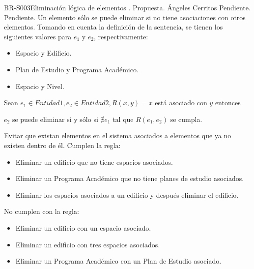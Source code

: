 \begin{BusinessRule}{BR-S003}{Eliminación lógica de elementos}
	{\bcCondition}    %
	{\btEnabler}     %
	{\blControlling}    %
	.
	\BRItem[Estado] Propuesta.
	 Ángeles Cerritos
	 Pendiente.
	 Pendiente.
	\BRItem[Descripción] Un elemento sólo se puede eliminar si no tiene asociaciones con otros elementos. Tomando en cuenta la definición de la sentencia, se tienen los siguientes valores para $e_1$ y $e_2$, respectivamente:
	
	\begin{itemize}
		\item Espacio y Edificio.
		\item Plan de Estudio y Programa Académico.
		\item Espacio y Nivel.
	\end{itemize}
	
	\BRItem[Sentencia] Sean $ e_1 \in Entidad1 , e_2 \in Entidad2, R(x,y) = x $ está asociado con $ y $ entonces
	
	$ e_2 $ se puede eliminar si y sólo si $ \nexists e_1 $ tal que $ R(e_1, e_2) $ se cumpla.
	
	
	\BRItem[Motivación] Evitar que existan elementos en el sistema asociados a elementos que ya no existen dentro de él.
	 Cumplen la regla:
	\begin{itemize}
		\item Eliminar un edificio que no tiene espacios asociados.
		\item Eliminar un Programa Académico que no tiene planes de estudio asociados.
		\item Eliminar los espacios asociados a un edificio y después eliminar el edificio.
	\end{itemize}
	 No cumplen con la regla:
	\begin{itemize}
		\item Eliminar un edificio con un espacio asociado.
		\item Eliminar un edificio con tres espacios asociados.
		\item Eliminar un Programa Académico con un Plan de Estudio asociado.
	\end{itemize}
\end{BusinessRule}

